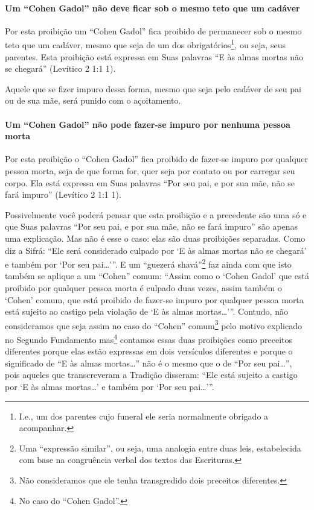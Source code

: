 \paragraph{Um ``Cohen Gadol'' não deve ficar sob o mesmo teto que um cadáver}

Por esta proibição um ``Cohen Gadol'' fica proibido de permanecer sob o
mesmo teto que um cadáver, mesmo que seja de um dos
obrigatórios\footnote{I.e., um dos parentes cujo funeral ele seria normalmente obrigado a acompanhar.}, ou seja, seus parentes. Esta
proibição está expressa em Suas palavras ``E às almas mortas não se
chegará'' (Levítico 2 1:1 1).

Aquele que se fizer impuro dessa forma, mesmo que seja pelo cadáver de
seu pai ou de sua mãe, será punido com o açoitamento.

\paragraph{Um ``Cohen Gadol'' não pode fazer-se impuro por nenhuma pessoa morta}

Por esta proibição o ``Cohen Gadol'' fica proibido de fazer-se impuro
por qualquer pessoa morta, seja de que forma for, quer seja por contato
ou por carregar seu corpo. Ela está expressa em Suas palavras ``Por seu
pai, e por sua mãe, não se fará impuro'' (Levítico 2 1:1 1).

Possivelmente você poderá pensar que esta proibição e a precedente são
uma só e que Suas palavras ``Por seu pai, e por sua mãe, não se fará
impuro'' são apenas uma explicação. Mas não é esse o caso: elas são
duas proibições separadas. Como diz a Sifrá: ``Ele será considerado
culpado por `E às almas mortas não se chegará' e também por `Por seu
pai\ldots{}'''. E um ``guezerá shavá''\footnote{Uma ``expressão similar'', ou seja, uma analogia entre duas leis,
  estabelecida com base na congruência verbal dos textos das
  Escrituras.} faz ainda com
que isto também se aplique a um ``Cohen'' comum: ``Assim como o `Cohen
Gadol' que está proibido por qualquer pessoa morta é culpado duas vezes,
assim também o `Cohen' comum, que está proibido de fazer-se impuro por
qualquer pessoa morta está sujeito ao castigo pela violação de `E às
almas mortas\ldots{}'''. Contudo, não consideramos que seja assim no caso do
``Cohen'' comum\footnote{Não consideramos que ele tenha transgredido dois preceitos
  diferentes.} pelo motivo explicado no Segundo
Fundamento mas\footnote{No caso do ``Cohen Gadol''.} contamos essas duas proibições
como preceitos diferentes porque elas estão expressas em dois
versículos diferentes e porque o significado de ``E às almas
mortas\ldots{}'' não é o mesmo que o de ``Por seu pai\ldots{}'', pois aqueles que
transcreveram a Tradição disseram: ``Ele está sujeito a castigo por `E
às almas mortas\ldots{}' e também por `Por seu pai\ldots{}'''.

